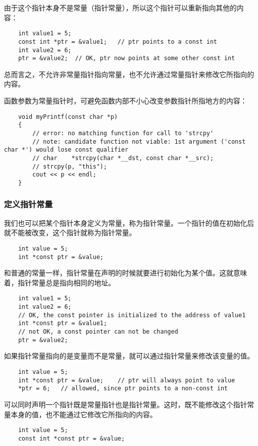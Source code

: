 \documentclass[UTF8]{ctexart}
\begin{document}
由于这个指针本身不是常量（指针常量），所以这个指针可以重新指向其他的内容：
\begin{verbatim}
    int value1 = 5;
    const int *ptr = &value1;   // ptr points to a const int
    int value2 = 6;
    ptr = &value2;  // OK, ptr now points at some other const int
\end{verbatim}

总而言之，不允许非常量指针指向常量，也不允许通过常量指针来修改它所指向的内容。

函数参数为常量指针时，可避免函数内部不小心改变参数指针所指地方的内容：
\begin{verbatim}
    void myPrintf(const char *p)
    {
        // error: no matching function for call to 'strcpy'
        // note: candidate function not viable: 1st argument ('const char *') would lose const qualifier
        // char    *strcpy(char *__dst, const char *__src);
        // strcpy(p, "this");
        cout << p << endl;
    }
\end{verbatim}

\subsubsection{定义指针常量}
我们也可以把某个指针本身定义为常量，称为指针常量。一个指针的值在初始化后就不能被改变，这个指针就称为指针常量。
\begin{verbatim}
    int value = 5;
    int *const ptr = &value;
\end{verbatim}

和普通的常量一样，指针常量在声明的时候就要进行初始化为某个值。这就意味着，指针常量总是指向相同的地址。
\begin{verbatim}
    int value1 = 5;
    int value2 = 6;
    // OK, the const pointer is initialized to the address of value1
    int *const ptr = &value1;
    // not OK, a const pointer can not be changed
    ptr = &value2;
\end{verbatim}

如果指针常量指向的是变量而不是常量，就可以通过指针常量来修改该变量的值。
\begin{verbatim}
    int value = 5;
    int *const ptr = &value;    // ptr will always point to value
    *ptr = 6;   // allowed, since ptr points to a non-const int
\end{verbatim}

可以同时声明一个指针既是常量指针也是指针常量。这时，既不能修改这个指针常量本身的值，也不能通过它修改它所指向的内容。
\begin{verbatim}
    int value = 5;
    const int *const ptr = &value;
\end{verbatim}
\end{document}
